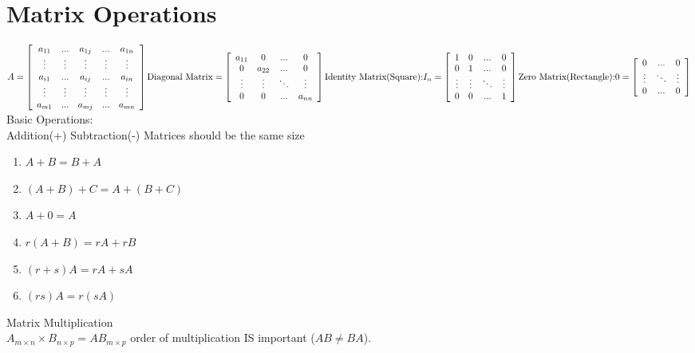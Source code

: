 \documentclass[a4paper,12pt,openany]{book}
\theoremstyle{defn}
\theoremstyle{expl}
\begin{document}
\section{Matrix Operations}
$A = \left[\begin{array}{ccccc}
a_{11}&...&a_{1j}&...&a_{1n}\\
\vdots&\vdots&\vdots&\vdots&\vdots\\
a_{i1}&...&a_{ij}&...&a_{in}\\
\vdots&\vdots&\vdots&\vdots&\vdots\\
a_{m1}&...&a_{mj}&...&a_{mn}
\end{array}\right]
\textup{Diagonal Matrix} = \left[\begin{array}{cccc}
a_{11}&0&...&0\\
0&a_{22}&...&0\\
\vdots&\vdots&\ddots&\vdots\\
0&0&...&a_{nn}
\end{array}\right]\\
\textup{Identity Matrix(Square):} I_n = \left[\begin{array}{cccc}1&0&...&0\\0&1&...&0\\\vdots&\vdots&\ddots&\vdots\\0&0&...&1\end{array}\right] \textup{Zero Matrix(Rectangle):} 0 = \left[\begin{array}{ccc}0&...&0\\\vdots&\ddots&\vdots\\0&...&0\end{array}\right]$\\
Basic Operations:\\
Addition(+) Subtraction(-) Matrices should be the same size\\
\begin{multicols}{2}
\begin{enumerate}
\item $A+B=B+A$
\item $(A+B)+C=A+(B+C)$
\item $A+0=A$
\item $r(A+B)=rA+rB$
\item $(r+s)A=rA+sA$
\item $(rs)A=r(sA)$
\end{enumerate}
\end{multicols}
\noindent Matrix Multiplication\\
$A_{m\times n} \times B_{n\times p} = AB_{m\times p}$ order of multiplication IS important ($AB \neq BA$).\\
\end{document}

